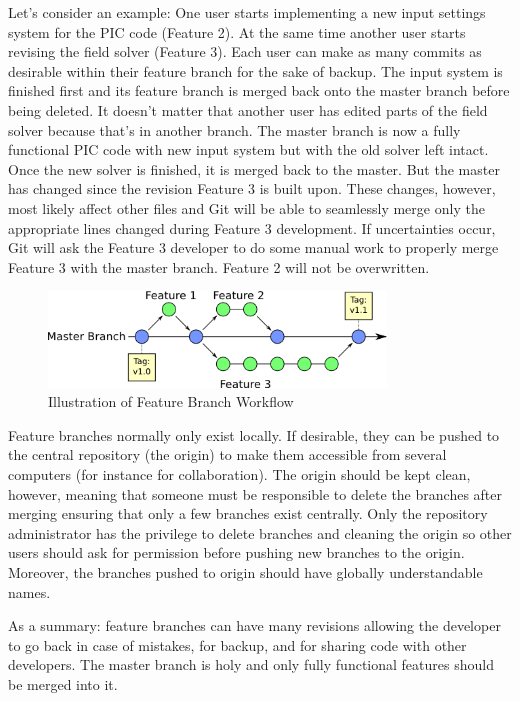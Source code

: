\documentclass[10pt,a4paper]{article}
\begin{document}
Let's consider an example: One user starts implementing a new input settings system for the PIC code (Feature 2). At the same time another user starts revising the field solver (Feature 3). Each user can make as many commits as desirable within their feature branch for the sake of backup. The input system is finished first and its feature branch is merged back onto the master branch before being deleted. It doesn't matter that another user has edited parts of the field solver because that's in another branch. The master branch is now a fully functional PIC code with new input system but with the old solver left intact. Once the new solver is finished, it is merged back to the master. But the master has changed since the revision Feature 3 is built upon. These changes, however, most likely affect other files and Git will be able to seamlessly merge only the appropriate lines changed during Feature 3 development. If uncertainties occur, Git will ask the Feature 3 developer to do some manual work to properly merge Feature 3 with the master branch. Feature 2 will not be overwritten.

\begin{figure}
	\centering
	\includegraphics[width=0.8\textwidth]{featurebranch.png}
	\caption{Illustration of Feature Branch Workflow}
	\label{fig:featurebranch}
\end{figure}

Feature branches normally only exist locally. If desirable, they can be pushed to the central repository (the origin) to make them accessible from several computers (for instance for collaboration). The origin should be kept clean, however, meaning that someone must be responsible to delete the branches after merging ensuring that only a few branches exist centrally. Only the repository administrator has the privilege to delete branches and cleaning the origin so other users should ask for permission before pushing new branches to the origin. Moreover, the branches pushed to origin should have globally understandable names.

As a summary: feature branches can have many revisions allowing the developer to go back in case of mistakes, for backup, and for sharing code with other developers. The master branch is holy and only fully functional features should be merged into it.
\end{document}
